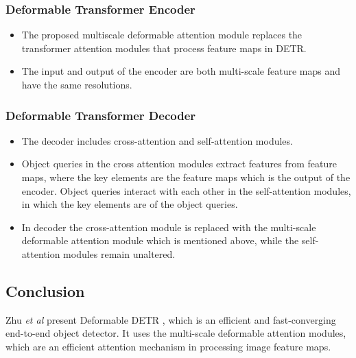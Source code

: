 \subsubsection{Deformable Transformer Encoder}
\begin{itemize}
	\item The proposed multiscale deformable attention module replaces the transformer attention modules that process feature maps in DETR.
	\item The input and output of the encoder are both multi-scale feature maps and have the same resolutions.
\end{itemize}	


\subsubsection{Deformable Transformer Decoder}

\begin{itemize}
	\item The decoder includes cross-attention and self-attention modules.
	\item Object queries in the cross attention modules extract features from feature maps, where the key elements are the feature maps which is the output of the encoder. Object queries interact with each other in the self-attention modules, in which the key elements are of the object queries.
	\item In decoder the cross-attention module is replaced with the multi-scale deformable attention module which is mentioned above, while the self-attention modules remain unaltered.
\end{itemize}
\subsection{Conclusion}
\par Zhu \textit{et al} present Deformable DETR \cite{zhu2020deformable}, which is an efficient and fast-converging end-to-end object detector. It uses the multi-scale deformable attention modules, which are an efficient attention mechanism in processing image feature maps.
